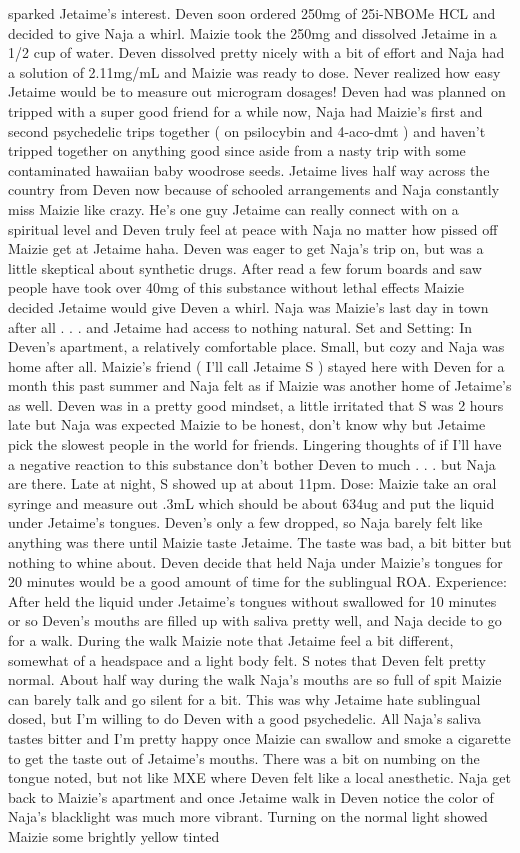 \documentclass[12pt]{book}
\begin{document}
sparked Jetaime's interest. Deven soon ordered 250mg of 25i-NBOMe HCL and decided to give Naja a whirl. Maizie took the 250mg and dissolved Jetaime in a 1/2 cup of water. Deven dissolved pretty nicely with a bit of effort and Naja had a solution of 2.11mg/mL and Maizie was ready to dose. Never realized how easy Jetaime would be to measure out microgram dosages! Deven had was planned on tripped with a super good friend for a while now, Naja had Maizie's first and second psychedelic trips together ( on psilocybin and 4-aco-dmt ) and haven't tripped together on anything good since aside from a nasty trip with some contaminated hawaiian baby woodrose seeds. Jetaime lives half way across the country from Deven now because of schooled arrangements and Naja constantly miss Maizie like crazy. He's one guy Jetaime can really connect with on a spiritual level and Deven truly feel at peace with Naja no matter how pissed off Maizie get at Jetaime haha. Deven was eager to get Naja's trip on, but was a little skeptical about synthetic drugs. After read a few forum boards and saw people have took over 40mg of this substance without lethal effects Maizie decided Jetaime would give Deven a whirl. Naja was Maizie's last day in town after all . . .  and Jetaime had access to nothing natural. Set and Setting: In Deven's apartment, a relatively comfortable place. Small, but cozy and Naja was home after all. Maizie's friend ( I'll call Jetaime S ) stayed here with Deven for a month this past summer and Naja felt as if Maizie was another home of Jetaime's as well. Deven was in a pretty good mindset, a little irritated that S was 2 hours late but Naja was expected Maizie to be honest, don't know why but Jetaime pick the slowest people in the world for friends. Lingering thoughts of if I'll have a negative reaction to this substance don't bother Deven to much . . .  but Naja are there. Late at night, S showed up at about 11pm. Dose: Maizie take an oral syringe and measure out .3mL which should be about 634ug and put the liquid under Jetaime's tongues. Deven's only a few dropped, so Naja barely felt like anything was there until Maizie taste Jetaime. The taste was bad, a bit bitter but nothing to whine about. Deven decide that held Naja under Maizie's tongues for 20 minutes would be a good amount of time for the sublingual ROA. Experience: After held the liquid under Jetaime's tongues without swallowed for 10 minutes or so Deven's mouths are filled up with saliva pretty well, and Naja decide to go for a walk. During the walk Maizie note that Jetaime feel a bit different, somewhat of a headspace and a light body felt. S notes that Deven felt pretty normal. About half way during the walk Naja's mouths are so full of spit Maizie can barely talk and go silent for a bit. This was why Jetaime hate sublingual dosed, but I'm willing to do Deven with a good psychedelic. All Naja's saliva tastes bitter and I'm pretty happy once Maizie can swallow and smoke a cigarette to get the taste out of Jetaime's mouths. There was a bit on numbing on the tongue noted, but not like MXE where Deven felt like a local anesthetic. Naja get back to Maizie's apartment and once Jetaime walk in Deven notice the color of Naja's blacklight was much more vibrant. Turning on the normal light showed Maizie some brightly yellow tinted 
\end{document}
